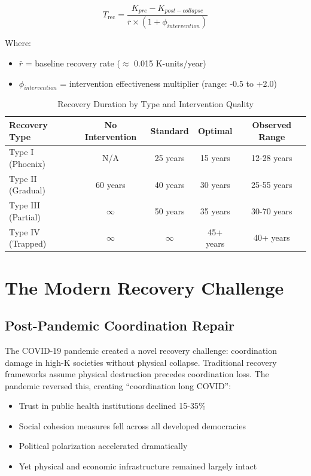\documentclass[11pt,letterpaper]{article}
\newcommand{\kindex}{K}
\newcommand{\Trec}{T_{\text{rec}}}
\begin{document}
\begin{equation}
\Trec = \frac{\kindex_{pre} - \kindex_{post-collapse}}{\bar{r} \times (1 + \phi_{intervention})}
\label{eq:recovery_time}
\end{equation}

Where:
\begin{itemize}
\item $\bar{r}$ = baseline recovery rate ($\approx$ 0.015 K-units/year)
\item $\phi_{intervention}$ = intervention effectiveness multiplier (range: -0.5 to +2.0)
\end{itemize}

\begin{table}[H]
\centering
\caption{Recovery Duration by Type and Intervention Quality}
\begin{tabular}{lcccc}
\toprule
\textbf{Recovery Type} & \textbf{No Intervention} & \textbf{Standard} & \textbf{Optimal} & \textbf{Observed Range} \\
\midrule
Type I (Phoenix) & N/A & 25 years & 15 years & 12-28 years \\
Type II (Gradual) & 60 years & 40 years & 30 years & 25-55 years \\
Type III (Partial) & $\infty$ & 50 years & 35 years & 30-70 years \\
Type IV (Trapped) & $\infty$ & $\infty$ & 45+ years & 40+ years \\
\bottomrule
\end{tabular}
\label{tab:recovery_duration}
\end{table}

\section{The Modern Recovery Challenge}

\subsection{Post-Pandemic Coordination Repair}

The COVID-19 pandemic created a novel recovery challenge: coordination damage in high-K societies without physical collapse. Traditional recovery frameworks assume physical destruction precedes coordination loss. The pandemic reversed this, creating ``coordination long COVID'':

\begin{itemize}
\item Trust in public health institutions declined 15-35\%
\item Social cohesion measures fell across all developed democracies
\item Political polarization accelerated dramatically
\item Yet physical and economic infrastructure remained largely intact
\end{itemize}
\end{document}
